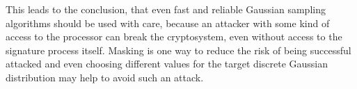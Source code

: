 This leads to the conclusion, that even fast and reliable Gaussian sampling algorithms should be used with care, because an attacker with some kind of access to the processor can break the cryptosystem, even without access to the signature process itself. Masking is one way to reduce the risk of being successful attacked and even choosing different values for the target discrete Gaussian distribution may help to avoid such an attack.